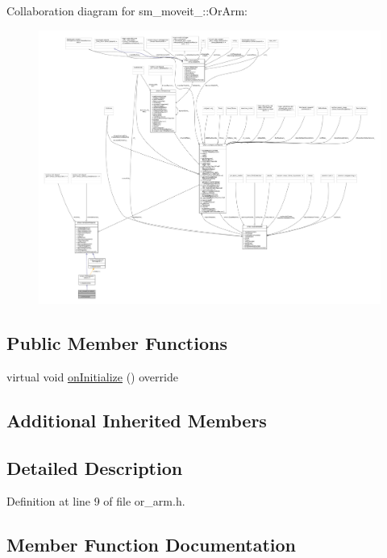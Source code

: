 Collaboration diagram for sm\+\_\+moveit\+\_\+:\+:Or\+Arm\+:
\nopagebreak
\begin{figure}[H]
\begin{center}
\leavevmode
\includegraphics[width=350pt]{classsm__moveit__3_1_1OrArm__coll__graph}
\end{center}
\end{figure}
\subsection*{Public Member Functions}
\begin{DoxyCompactItemize}
\item 
virtual void \hyperlink{classsm__moveit__3_1_1OrArm_ae837d8d25be950a5a06bc523e7224028}{on\+Initialize} () override
\end{DoxyCompactItemize}
\subsection*{Additional Inherited Members}


\subsection{Detailed Description}


Definition at line 9 of file or\+\_\+arm.\+h.



\subsection{Member Function Documentation}
\mbox{\label{classsm__moveit__3_1_1OrArm_ae837d8d25be950a5a06bc523e7224028}} 

